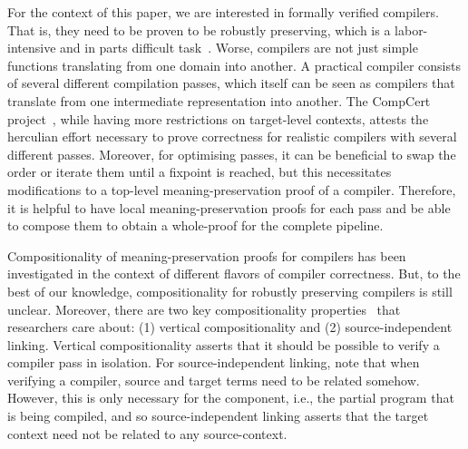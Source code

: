 For the context of this paper, we are interested in formally verified compilers.
That is, they need to be proven to be robustly preserving, which is a labor-intensive and in parts difficult task~\cite{}. %
Worse, compilers are not just simple functions translating from one domain into another. 
A practical compiler consists of several different compilation passes, which itself can be seen as compilers that translate from one intermediate representation into another.
The CompCert project~\cite{}, while having more restrictions on target-level contexts, attests the herculian effort necessary to prove correctness for realistic compilers with several different passes.
Moreover, for optimising passes, it can be beneficial to swap the order or iterate them until a fixpoint is reached, but this necessitates modifications to a top-level meaning-preservation proof of a compiler.
Therefore, it is helpful to have local meaning-preservation proofs for each pass and be able to compose them to obtain a whole-proof for the complete pipeline.

Compositionality of meaning-preservation proofs for compilers has been investigated in the context of different flavors of compiler correctness. 
But, to the best of our knowledge, compositionality for robustly preserving compilers is still unclear.
Moreover, there are two key compositionality properties~\cite{} that researchers care about: (1) vertical compositionality and (2) source-independent linking. 
Vertical compositionality asserts that it should be possible to verify a compiler pass in isolation.
For source-independent linking, note that when verifying a compiler, source and target terms need to be related somehow.
However, this is only necessary for the component, i.e., the partial program that is being compiled, and so source-independent linking asserts that the target context need not be related to any source-context.

